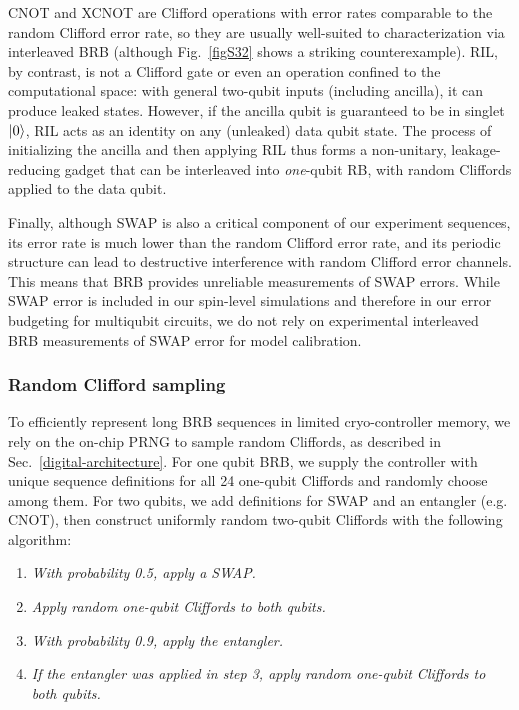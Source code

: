 \documentclass[aps,prl,twocolumn,superscriptaddress,nobibnotes,10pt,floatfix]{revtex4-2}
\newcommand{\secref}[1]{Sec.~\ref{#1}}
\newcommand{\figref}[1]{Fig.~\ref{#1}}
\begin{document}
CNOT and XCNOT are Clifford operations with error rates comparable to the random Clifford error rate, so they are usually well-suited to characterization via interleaved BRB (although \figref{figS32} shows a striking counterexample).
RIL, by contrast, is not a Clifford gate or even an operation confined to the computational space: with general two-qubit inputs (including ancilla), it can produce leaked states.
However, if the ancilla qubit is guaranteed to be in singlet \(\ket{0}\), RIL acts as an identity on any (unleaked) data qubit state.
The process of initializing the ancilla and then applying RIL thus forms a non-unitary, leakage-reducing gadget that can be interleaved into \emph{one}-qubit RB, with random Cliffords applied to the data qubit.

Finally, although SWAP is also a critical component of our experiment sequences, its error rate is much lower than the random Clifford error rate, and its periodic structure can lead to destructive interference with random Clifford error channels.
This means that BRB provides unreliable measurements of SWAP errors.
While SWAP error is included in our spin-level simulations and therefore in our error budgeting for multiqubit circuits, we do not rely on experimental interleaved BRB measurements of SWAP error for model calibration.

\subsubsection{Random Clifford sampling}\label{random-clifford-sampling}

To efficiently represent long BRB sequences in limited cryo-controller memory, we rely on the on-chip PRNG to sample random Cliffords, as described in \secref{digital-architecture}.
For one qubit BRB, we supply the controller with unique sequence definitions for all 24 one-qubit Cliffords and randomly choose among them.
For two qubits, we add definitions for SWAP and an entangler (e.g. CNOT), then construct uniformly random two-qubit Cliffords with the following algorithm:

\begin{enumerate}
\def\labelenumi{\arabic{enumi}.}
\item
\emph{With probability 0.5, apply a SWAP.}
\item
\emph{Apply random one-qubit Cliffords to both qubits.}
\item
\emph{With probability 0.9, apply the entangler.}
\item
\emph{If the entangler was applied in step 3, apply random one-qubit
	Cliffords to both qubits.}
	\end{enumerate}
\end{document}
